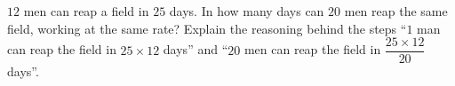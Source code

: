 $12$ men can reap a field in $25$ days. In how many days can $20$ men reap the same field, working at the same rate? Explain the reasoning behind the steps ``$1$ man can reap the field in $25\times12$ days'' and ``$20$ men can reap the field in $\dfrac{25\times12}{20}$ days''.
